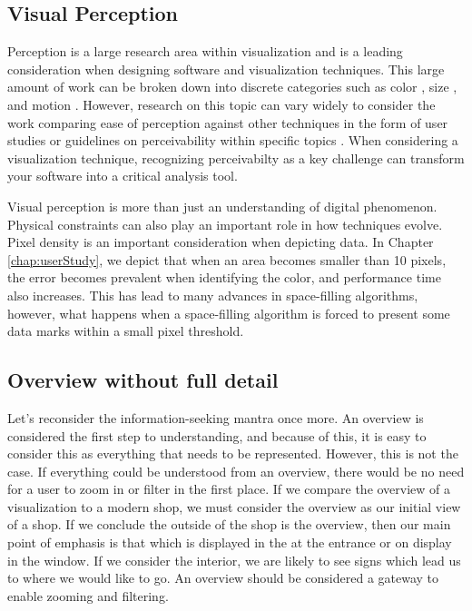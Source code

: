 \subsection{Visual Perception}
Perception is a large research area within visualization and is a leading consideration when designing software and visualization techniques. This large amount of work can be broken down into discrete categories such as color \cite{lee2013perceptually,heer2012color,szafir2018modeling}, size \cite{mcnabb2018when,borgo2014order,gramazio2014relation}, and motion \cite{simons2000current, driver1992motion, huber2005visualizing}. However, research on this topic can vary widely to consider the work comparing ease of perception against other techniques in the form of user studies \cite{rittschof1998learning} or guidelines on perceivability within specific topics \cite{kong2010perceptual}. When considering a visualization technique, recognizing perceivabilty as a key challenge can transform your software into a critical analysis tool. 

Visual perception is more than just an understanding of digital phenomenon. Physical constraints can also play an important role in how techniques evolve. Pixel density is an important consideration when depicting data. In Chapter \ref{chap:userStudy}, we depict that when an area becomes smaller than 10 pixels, the error becomes prevalent when identifying the color, and performance time also increases. This has lead to many advances in space-filling algorithms, however, what happens when a space-filling algorithm is forced to present some data marks within a small pixel threshold. %

\subsection{Overview without full detail}
Let's reconsider the information-seeking mantra once more. An overview is considered the first step to understanding, and because of this, it is easy to consider this as everything that needs to be represented. However, this is not the case. If everything could be understood from an overview, there would be no need for a user to zoom in or filter in the first place. If we compare the overview of a visualization to a modern shop, we must consider the overview as our initial view of a shop. If we conclude the outside of the shop is the overview, then our main point of emphasis is that which is displayed in the at the entrance or on display in the window. If we consider the interior, we are likely to see signs which lead us to where we would like to go. An overview should be considered a gateway to enable zooming and filtering.

